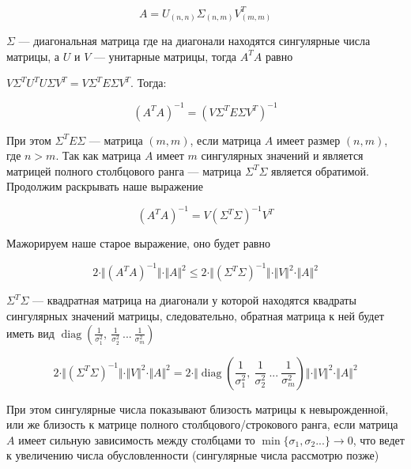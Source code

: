 \documentclass{article}
\begin{document}
    \begin{equation}
        A = U_{(n, n)} \Sigma_{(n, m)} V^{T}_{(m, m)}
    \end{equation}

    $\Sigma$ --- диагональная матрица где на диагонали находятся сингулярные числа матрицы, а $U$ и $V$ --- унитарные матрицы, тогда
    $A^{T}A$ равно

    $V \Sigma^{T} U^{T}  U \Sigma V^{T} = V \Sigma^{T} E \Sigma V^{T}$.
    Тогда:

    \begin{equation}
    (A^{T}A)^{-1} = (V \Sigma^{T} E \Sigma V^{T})^{-1}
    \end{equation}

    При этом $\Sigma^{T} E \Sigma $ --- матрица $(m, m)$, если матрица $A$ имеет размер $(n, m)$, где $n > m$.
    Так как матрица $A$ имеет $m$ сингулярных значений и является матрицей полного столбцового ранга ---
    матрица $\Sigma^{T} \Sigma$ является обратимой.
    Продолжим раскрывать наше выражение

    \begin{equation}
        (A^{T}A)^{-1} = V (\Sigma^{T} \Sigma)^{-1} V^{T}
    \end{equation}

    Мажорируем наше старое выражение, оно будет равно

    \begin{equation}
        2 \cdot \Vert (A^{T} A)^{-1} \Vert \cdot \Vert A \Vert^{2} \leq 2 \cdot \Vert (\Sigma^{T} \Sigma)^{-1} \Vert \cdot \Vert V \Vert^{2} \cdot \Vert A \Vert^{2}
    \end{equation}

    $\Sigma^{T} \Sigma$ --- квадратная матрица на диагонали у которой находятся квадраты сингулярных значений матрицы,
    следовательно, обратная матрица к ней будет иметь вид $\operatorname{diag}(\frac{1}{\sigma_{1}^{2} }, \ \frac{1}{\sigma_{2}^{2} } \ ... \ \frac{1}{\sigma_{m}^{2} })$


    \begin{equation}
        2 \cdot \Vert (\Sigma^{T} \Sigma)^{-1} \Vert \cdot \Vert V \Vert^{2} \cdot \Vert A \Vert^{2} = 2 \cdot \Vert     \operatorname{diag}(\frac{1}{\sigma_{1}^{2} }, \ \frac{1}{\sigma_{2}^{2} } \ ... \ \frac{1}{\sigma_{m}^{2} })\Vert \cdot \Vert V \Vert^{2} \cdot \Vert A \Vert^{2}
    \end{equation}

    При этом сингулярные числа показывают близость матрицы к невырожденной, или же близость к матрице полного столбцового/строкового ранга,
    если матрица $A$ имеет сильную зависимость между столбцами то $\min\{\sigma_{1}, \sigma_{2} ... \} \rightarrow 0$, что ведет к увеличению числа обусловленности (сингулярные числа рассмотрю позже)
\end{document}
